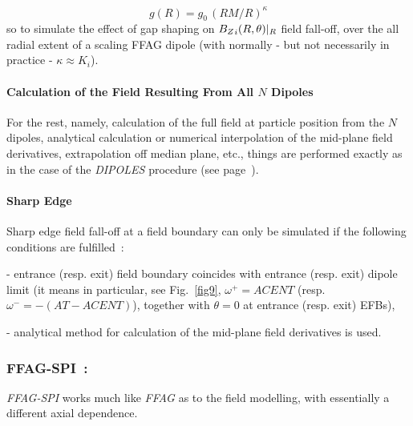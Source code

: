 {\begin{equation}
\label{EqggvsR}
g(R) = g_0 \, (RM/R)^{\kappa}
\end{equation}
%
\noindent  so to simulate the effect of gap shaping on $ {B_Z}_i(R,\theta)|_R$ field fall-off,  over the 
all radial extent of a scaling FFAG dipole (with normally - but not 
necessarily in practice - $\kappa \approx K_i$). 
 

\medskip

\paragraph{Calculation of the Field Resulting From All $N$ Dipoles}

For the rest, namely, calculation of the full field at particle position from the $N$ dipoles, 
analytical   calculation or numerical interpolation of the  mid-plane field derivatives, 
extrapolation off median plane, etc., things are performed exactly as in the case of the 
 \textsl{DIPOLES} procedure (see page~\pageref{FFatAP}). 




\medskip

\paragraph{Sharp Edge} 

\noindent Sharp edge field fall-off at a field boundary  can only be simulated if the following conditions are fulfilled~: 

- entrance (resp. exit)  field boundary  coincides with entrance (resp. exit) 
dipole limit (it means in particular, see Fig.~\ref{fig9},  
$\omega^+= ACENT$ (resp. $\omega^- = -(AT-ACENT)$), 
together with $\theta=0$ at entrance (resp. exit) EFBs), 

- analytical method for calculation of the  mid-plane field derivatives is used. 







\newpage


\subsubsection*{FFAG-SPI~: \FFAGSPITitl~\cite{reportICFAFFAG,reportNIMFFAGSPI}} \label{FFAG-SPI}   
\medskip

\noindent \textsl{FFAG-SPI} works much like \textsl{FFAG} as to the field modelling, 
with essentially a different axial  dependence. 

}

